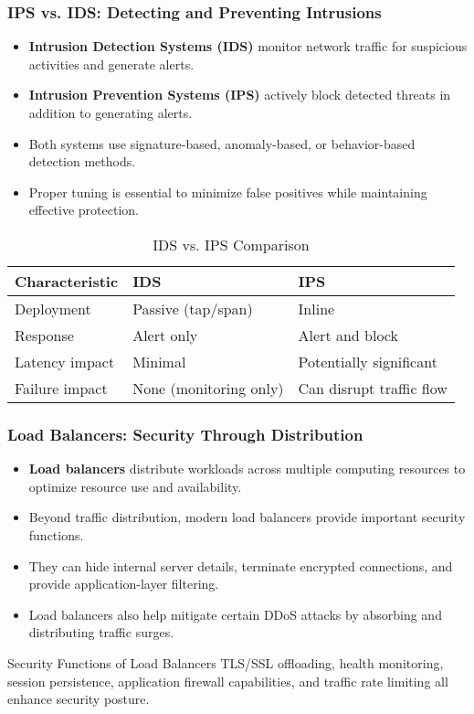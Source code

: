 \documentclass{beamer}
\begin{document}
\begin{frame}
    \frametitle{IPS vs. IDS: Detecting and Preventing Intrusions}
    \begin{itemize}
        \item \textbf{Intrusion Detection Systems (IDS)} monitor network traffic for suspicious activities and generate alerts.
        \item \textbf{Intrusion Prevention Systems (IPS)} actively block detected threats in addition to generating alerts.
        \item Both systems use signature-based, anomaly-based, or behavior-based detection methods.
        \item Proper tuning is essential to minimize false positives while maintaining effective protection.
    \end{itemize}
    
    \begin{table}
        \centering
        \begin{tabular}{|l|l|l|}
            \hline
            \textbf{Characteristic} & \textbf{IDS} & \textbf{IPS} \\
            \hline
            Deployment & Passive (tap/span) & Inline \\
            \hline
            Response & Alert only & Alert and block \\
            \hline
            Latency impact & Minimal & Potentially significant \\
            \hline
            Failure impact & None (monitoring only) & Can disrupt traffic flow \\
            \hline
        \end{tabular}
        \caption{IDS vs. IPS Comparison}
    \end{table}
\end{frame}

\begin{frame}
    \frametitle{Load Balancers: Security Through Distribution}
    \begin{itemize}
        \item \textbf{Load balancers} distribute workloads across multiple computing resources to optimize resource use and availability.
        \item Beyond traffic distribution, modern load balancers provide important security functions.
        \item They can hide internal server details, terminate encrypted connections, and provide application-layer filtering.
        \item Load balancers also help mitigate certain DDoS attacks by absorbing and distributing traffic surges.
    \end{itemize}
    
    \begin{alertblock}{Security Functions of Load Balancers}
        TLS/SSL offloading, health monitoring, session persistence, application firewall capabilities, and traffic rate limiting all enhance security posture.
    \end{alertblock}
\end{frame}
\end{document}
